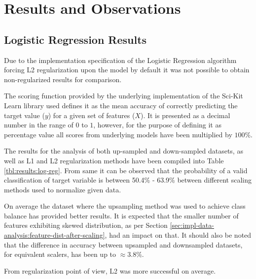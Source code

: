 \chapter{Results and Observations}\label{chp:results-and-observations}
\section{Logistic Regression Results}\label{sec:results:log-reg}
Due to the implementation specification of the Logistic Regression algorithm forcing L2 regularization upon the model by default it was not possible to obtain non-regularized results for comparison.

The scoring function provided by the underlying implementation of the Sci-Kit Learn library used defines it as the mean accuracy of correctly predicting the target value ($y$) for a given set of features ($X$). It is presented as a decimal number in the range of $ 0$ to $1$, however, for the purpose of defining it as percentage value all scores from underlying models have been multiplied by $100\%$.

The results for the analysis of both up-sampled and down-sampled datasets, as well as L1 and L2 regularization methods have been compiled into Table \ref{tbl:results:log-reg}. From same it can be observed that the probability of a valid classification of \isBug{} target variable is between 50.4\% - 63.9\% between different scaling methods used to normalize given data.

On average the dataset where the upsampling method was used to achieve class balance has provided better results. It is expected that the smaller number of features exhibiting skewed distribution, as per Section \ref{sec:impl-data-analysis:feature-dist-after-scaling}, had an impact on that. It should also be noted that the difference in accuracy between upsampled and downsampled datasets, for equivalent scalers, has been up to $\approx 3.8\%$.

From regularization point of view, L2 was more successful on average.

